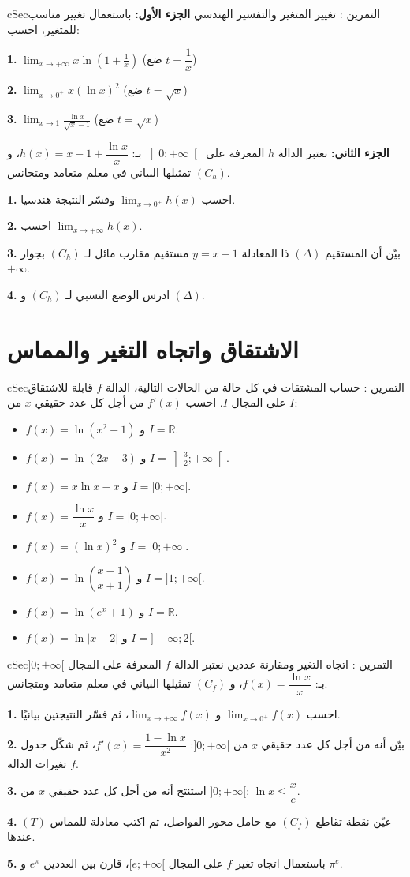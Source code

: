 \documentclass[12pt,a4paper]{article}
\newenvironment{BOX}[2]{\begin{otherlanguage}{english}\begin{arbox}{#1}{#2}}{\end{arbox}\end{otherlanguage}}
\newcounter{exo}
\newenvironment{tamrin}[1]{\stepcounter{exo}\begin{BOX}{cSec}{التمرين \theexo: #1}}{\end{BOX}}
\newcommand{\R}{\mathbb{R}}
\newenvironment{sq}{\begin{itemize}[leftmargin=2.4em,itemsep=3pt]}{\end{itemize}}
\newcommand{\qa}{\item[(أ)]}\newcommand{\qb}{\item[(ب)]}\newcommand{\qc}{\item[(جـ)]}\newcommand{\qd}{\item[(د)]}\newcommand{\qe}{\item[(هـ)]}
\newcommand{\QQ}[1]{\par\smallskip\textbf{#1.} }
\begin{document}
\begin{tamrin}{تغيير المتغير والتفسير الهندسي}
\textbf{الجزء الأول:} باستعمال تغيير مناسب للمتغير، احسب:
\QQ{1} $\displaystyle\lim_{x\to+\infty}x\ln\left(1+\frac1x\right)$ \quad (ضع $t=\dfrac1x$)
\QQ{2} $\displaystyle\lim_{x\to 0^{+}}x\left(\ln x\right)^{2}$ \quad (ضع $t=\sqrt x$)
\QQ{3} $\displaystyle\lim_{x\to 1}\frac{\ln x}{\sqrt x-1}$ \quad (ضع $t=\sqrt x$)

\textbf{الجزء الثاني:} نعتبر الدالة $h$ المعرفة على $\left]0;+\infty\right[$ بـ: $h(x)=x-1+\dfrac{\ln x}{x}$، و $(C_h)$ تمثيلها البياني في معلم متعامد ومتجانس.
\QQ{1} احسب $\displaystyle\lim_{x\to 0^{+}}h(x)$ وفسّر النتيجة هندسيا.
\QQ{2} احسب $\displaystyle\lim_{x\to+\infty}h(x)$.
\QQ{3} بيّن أن المستقيم $(\Delta)$ ذا المعادلة $y=x-1$ مستقيم مقارب مائل لـ $(C_h)$ بجوار $+\infty$.
\QQ{4} ادرس الوضع النسبي لـ $(C_h)$ و $(\Delta)$.
\end{tamrin}

\section{الاشتقاق واتجاه التغير والمماس}

\begin{tamrin}{حساب المشتقات}
في كل حالة من الحالات التالية، الدالة $f$ قابلة للاشتقاق على المجال $I$. احسب $f'(x)$ من أجل كل عدد حقيقي $x$ من $I$:
\begin{sq}
\qa $f(x)=\ln\left(x^2+1\right)$ \quad و \quad $I=\R$.
\qb $f(x)=\ln(2x-3)$ \quad و \quad $I=\left]\frac32;+\infty\right[$.
\qc $f(x)=x\ln x-x$ \quad و \quad $I=]0;+\infty[$.
\qd $f(x)=\dfrac{\ln x}{x}$ \quad و \quad $I=]0;+\infty[$.
\qe $f(x)=(\ln x)^2$ \quad و \quad $I=]0;+\infty[$.
\item[(و)] $f(x)=\ln\left(\dfrac{x-1}{x+1}\right)$ \quad و \quad $I=]1;+\infty[$.
\item[(ز)] $f(x)=\ln\left(e^x+1\right)$ \quad و \quad $I=\R$.
\item[(ح)] $f(x)=\ln|x-2|$ \quad و \quad $I=]-\infty;2[$.
\end{sq}
\end{tamrin}

\begin{tamrin}{اتجاه التغير ومقارنة عددين}
نعتبر الدالة $f$ المعرفة على المجال $]0;+\infty[$ بـ: $f(x)=\dfrac{\ln x}{x}$، و $(C_f)$ تمثيلها البياني في معلم متعامد ومتجانس.
\QQ{1} احسب $\displaystyle\lim_{x\to0^{+}}f(x)$ و $\displaystyle\lim_{x\to+\infty}f(x)$، ثم فسّر النتيجتين بيانيًا.
\QQ{2} بيّن أنه من أجل كل عدد حقيقي $x$ من $]0;+\infty[$: $f'(x)=\dfrac{1-\ln x}{x^2}$، ثم شكّل جدول تغيرات الدالة $f$.
\QQ{3} استنتج أنه من أجل كل عدد حقيقي $x$ من $]0;+\infty[$: $\ln x\leqslant \dfrac{x}{e}$.
\QQ{4} عيّن نقطة تقاطع $(C_f)$ مع حامل محور الفواصل، ثم اكتب معادلة للمماس $(T)$ عندها.
\QQ{5} باستعمال اتجاه تغير $f$ على المجال $[e;+\infty[$، قارن بين العددين $e^{\pi}$ و $\pi^{e}$.
\end{tamrin}
\end{document}
